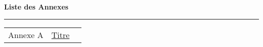 
\Annexes
{}
\renewcommand{\thechapter}{A}
\setcounter{figure}{0}
\renewcommand{\leftmark}{Annexes}
\renewcommand{\rightmark}{Annexes}
  \vspace{15pt}%
  {\Huge {}\selectfont \textbf{Liste des Annexes}}
   \par\nobreak
    \vspace{15pt}
       \hrule
   \vskip20pt
	\normalsize

\begin{tabular}{lp{11.5cm}r}
	Annexe A & \hyperref[annexe-article]{Titre}  \dotfill& \textbf{\pageref{annexe-article}}\\
\end{tabular}

  \EmptyNewPage


{
}

